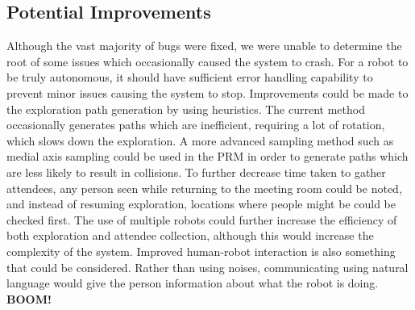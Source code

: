 \documentclass[conference]{IEEEtran}
\begin{document}
\subsection{Potential Improvements}
Although the vast majority of bugs were fixed, we were unable to determine the root of some issues which occasionally caused the system to crash. For a robot to be truly autonomous, it should have sufficient error handling capability to prevent minor issues causing the system to stop. Improvements could be made to the exploration path generation by using heuristics. The current method occasionally generates paths which are inefficient, requiring a lot of rotation, which slows down the exploration. A more advanced sampling method such as medial axis sampling could be used in the PRM in order to generate paths which are less likely to result in collisions. To further decrease time taken to gather attendees, any person seen while returning to the meeting room could be noted, and instead of resuming exploration, locations where people might be could be checked first. The use of multiple robots could further increase the efficiency of both exploration and attendee collection, although this would increase the complexity of the system. Improved human-robot interaction is also something that could be considered. Rather than using noises, communicating using natural language would give the person information about what the robot is doing. \textbf{BOOM!}


\end{document}
